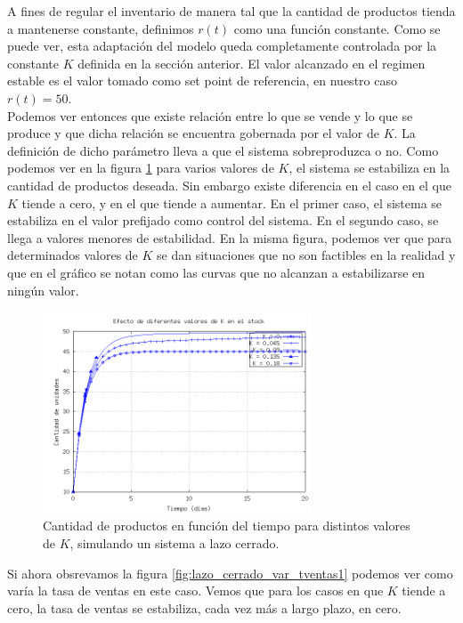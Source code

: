\documentclass{sig-alternate}
\begin{document}
A fines de regular el inventario de manera tal que la cantidad de productos tienda a mantenerse constante, definimos $r(t)$ como una función
constante.
Como se puede ver, esta adaptación del modelo queda completamente controlada por la constante $K$ definida en la sección anterior.  El valor alcanzado en el regimen estable
es el valor tomado como set point de referencia, en nuestro caso $r(t) = 50$.\\
Podemos ver entonces que existe relación entre lo que se vende y lo que se produce y que dicha relación se encuentra gobernada por el valor de
$K$. La definición de dicho parámetro lleva a que el sistema sobreproduzca o no. Como podemos ver en la figura \ref{fig:lazo_cerrado_cant_unidades} para varios valores de $K$, 
el sistema se estabiliza en la cantidad de productos deseada. Sin embargo existe diferencia en el caso en el que $K$ tiende a cero, y en el que
tiende a aumentar. En el primer caso, el sistema se estabiliza en el valor prefijado como control del sistema. En el segundo caso, se llega a valores
menores de estabilidad. En la misma figura, podemos ver que para determinados valores de $K$ se dan situaciones que no son factibles en la realidad y que en el gráfico
se notan como las curvas que no alcanzan a estabilizarse en ningún valor.
\begin{figure}[h]
\begin{center}
\includegraphics[width=8cm]{../src/k_plot.png}
\caption{\label{fig:lazo_cerrado_cant_unidades}Cantidad de productos en función del tiempo para distintos valores de $K$, simulando un sistema
a lazo cerrado.}
\end{center}
\end{figure}
Si ahora obsrevamos la figura \ref{fig:lazo_cerrado_var_tventas1} podemos ver como varía la tasa de ventas en este caso. Vemos que para los casos 
en que $K$ tiende a cero, la tasa de ventas se estabiliza, cada vez más a largo plazo, en cero.
\end{document}

